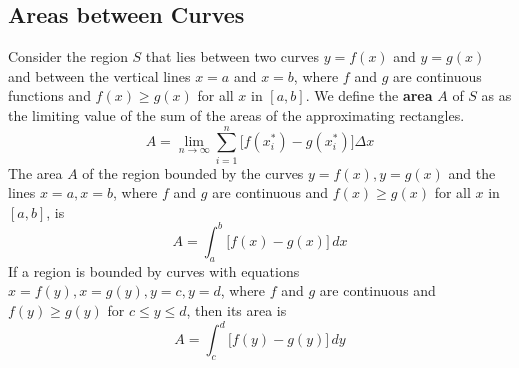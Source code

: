 \subsection{Areas between Curves}

Consider the region \(S\) that lies between two curves \(y=f(x)\) and
\(y=g(x)\) and between the vertical lines \(x=a\) and \(x=b\), where \(f\)
and \(g\) are continuous functions and \(f(x)\geq g(x)\) for all \(x\) in
\([a,b]\).
We define the \textbf{area} \(A\) of \(S\) as as the limiting value of the sum
of the areas of the approximating rectangles.
\[A=\lim_{n\to\infty}\sum_{i=1}^n\big[f(x_i^*)-g(x_i^*)\big]\Delta x\]
The area \(A\) of the region bounded by the curves \(y=f(x),y=g(x)\) and the
lines \(x=a,x=b\), where \(f\) and \(g\) are continuous and \(f(x)\geq g(x)\)
for all \(x\) in \([a,b]\), is
\[A=\int_a^b \big[f(x)-g(x)\big]\,dx\]
If a region is bounded by curves with equations \(x=f(y),x=g(y),y=c,y=d\),
where \(f\) and \(g\) are continuous and \(f(y)\geq g(y)\) for
\(c\leq y\leq d\), then its area is
\[A=\int_c^d \big[f(y)-g(y)\big]\,dy\]